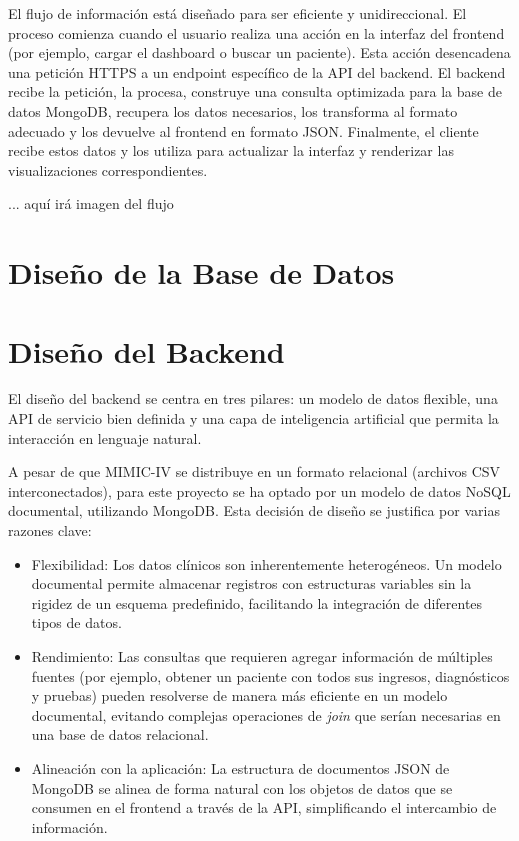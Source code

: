 El flujo de información está diseñado para ser eficiente y unidireccional. El proceso comienza cuando el usuario realiza una acción en la interfaz del frontend (por ejemplo, cargar el dashboard o buscar un paciente). Esta acción desencadena una petición HTTPS a un endpoint específico de la API del backend. El backend recibe la petición, la procesa, construye una consulta optimizada para la base de datos MongoDB, recupera los datos necesarios, los transforma al formato adecuado y los devuelve al frontend en formato JSON. Finalmente, el cliente recibe estos datos y los utiliza para actualizar la interfaz y renderizar las visualizaciones correspondientes.

... aquí irá imagen del flujo

\section{Diseño de la Base de Datos}

\section{Diseño del Backend}

El diseño del backend se centra en tres pilares: un modelo de datos flexible, una API de servicio bien definida y una capa de inteligencia artificial que permita la interacción en lenguaje natural.


A pesar de que MIMIC-IV se distribuye en un formato relacional (archivos CSV interconectados), para este proyecto se ha optado por un modelo de datos NoSQL documental, utilizando MongoDB. Esta decisión de diseño se justifica por varias razones clave:
\begin{itemize}
    \item Flexibilidad: Los datos clínicos son inherentemente heterogéneos. Un modelo documental permite almacenar registros con estructuras variables sin la rigidez de un esquema predefinido, facilitando la integración de diferentes tipos de datos.
    \item Rendimiento: Las consultas que requieren agregar información de múltiples fuentes (por ejemplo, obtener un paciente con todos sus ingresos, diagnósticos y pruebas) pueden resolverse de manera más eficiente en un modelo documental, evitando complejas operaciones de \textit{join} que serían necesarias en una base de datos relacional.
    \item Alineación con la aplicación: La estructura de documentos JSON de MongoDB se alinea de forma natural con los objetos de datos que se consumen en el frontend a través de la API, simplificando el intercambio de información.
\end{itemize}


